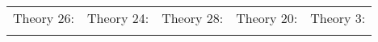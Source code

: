 \documentclass[crop,12pt]{standalone}
\newcommand{\cmark}{\ding{51}}%
\newcommand{\xmark}{\ding{55}}%
\begin{document}
\begin{tabular}{c c c c c}
  \huge{Theory 26: {\color{red}\xmark}} & \huge{Theory 24: {\color{red}\xmark}} & \huge{Theory 28: {\color{red}\xmark}} & \huge{Theory 20: {\color{green}\cmark}} & \huge{Theory 3: {\color{red}\xmark}} \\
\begin{equation*}\!
  
\end{equation*} &
\begin{equation*}\!
  
  \label{<+label+>}
\end{equation*} &
\begin{equation*}\!
  
  \label{<+label+>}
\end{equation*} &
\begin{equation*}\!
  
  \label{<+label+>}
\end{equation*} &
\begin{equation*}\!
  
  \label{<+label+>}
\end{equation*}
\end{tabular}
\end{document}

